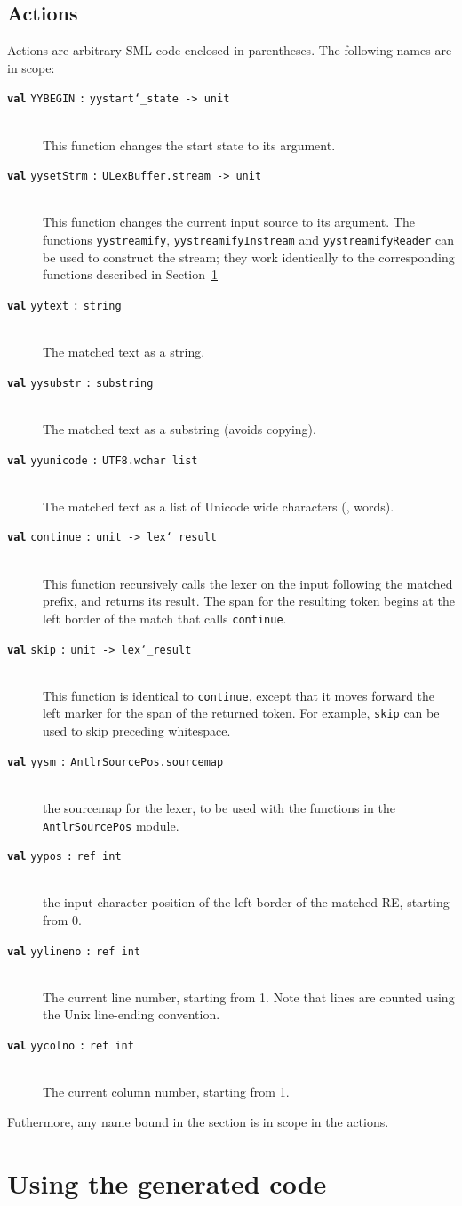 \subsection{Actions}\label{sec:ulex-actions}

\newcommand{\itemtt}[2]{\item[{\normalfont\textbf{\texttt{val}} \texttt{#1} \texttt{:} \texttt{#2}}]\mbox{}\\}

Actions are arbitrary SML code enclosed in parentheses.  The following names are in scope:
\begin{description}
  \itemtt{YYBEGIN}{yystart\char`\_state -> unit}
    This function changes the start state to its argument.
  \itemtt{yysetStrm}{ULexBuffer.stream -> unit}
    This function changes the current input source to its argument.
    The functions \texttt{yystreamify}, \texttt{yystreamifyInstream} and \texttt{yystreamifyReader}
    can be used to construct the stream; they work identically to the corresponding functions
    described in Section~\ref{sec:ulex-code}
  \itemtt{yytext}{string}
    The matched text as a string.
  \itemtt{yysubstr}{substring}
    The matched text as a substring (avoids copying).
  \itemtt{yyunicode}{UTF8.wchar list}
    The matched text as a list of Unicode wide characters (\ie{}, words).
  \itemtt{continue}{unit -> lex\char`\_result}
    This function recursively calls the lexer on the input following the matched prefix, and returns its result.
    The span for the resulting token begins at the left border of the match that calls \texttt{continue}.
  \itemtt{skip}{unit -> lex\char`\_result}
    This function is identical to \texttt{continue}, except that it moves forward the left marker
    for the span of the returned token.
    For example, \texttt{skip} can be used to skip preceding whitespace.
  \itemtt{yysm}{AntlrSourcePos.sourcemap}
    the sourcemap for the lexer, to be used with the functions in the \texttt{AntlrSourcePos} module.
  \itemtt{yypos}{ref int}
    the input character position of the left border of the matched RE, starting from 0.
  \itemtt{yylineno}{ref int}
    The current line number, starting from 1.
    Note that lines are counted using the Unix line-ending convention.
  \itemtt{yycolno}{ref int}
    The current column number, starting from 1.
\end{description}%
Futhermore, any name bound in the  section is in scope in the actions.

\section{Using the generated code}\label{sec:ulex-code}

